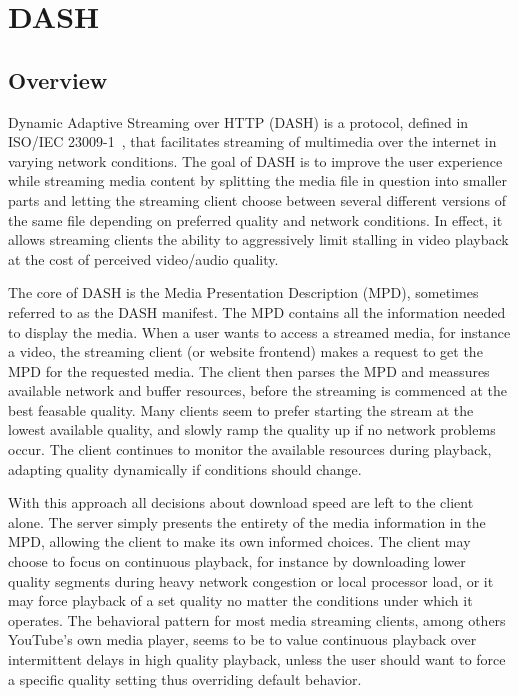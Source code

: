 \section{DASH}

\subsection{Overview}

Dynamic Adaptive Streaming over HTTP (DASH) is a protocol, defined in
ISO/IEC 23009-1~\cite{iso-dash-2014}, that facilitates 
streaming of multimedia over the internet in varying network conditions.
The goal of DASH is to improve the user
experience while streaming media content by splitting the media file in question
into smaller parts and letting the streaming client choose between several
different versions of the same file depending on preferred quality and network
conditions. In effect, it allows streaming clients the ability to aggressively
limit stalling in video playback at the cost of perceived video/audio quality.

The core of DASH is the Media Presentation Description (MPD), sometimes
referred to as the DASH manifest. The MPD contains all the information
needed to display the media. When a user wants to access a streamed
media, for instance a video, the streaming client (or website frontend)
makes a request to get the MPD for the requested media. The client then
parses the MPD and meassures available network and buffer resources,
before the streaming is commenced at the best feasable quality. Many clients %
seem to prefer starting the stream at the lowest available quality, and
slowly ramp the quality up if no network problems occur. The
client continues to monitor the available resources during playback, adapting
quality dynamically if conditions should change.

With this approach all decisions about download speed are left to the client
alone.
The server simply presents the entirety of the media information in the MPD,
allowing the client to make its own informed choices. The client may choose
to focus on continuous playback, for instance by downloading lower quality
segments during heavy network congestion or local processor load, or it may
force playback of a set quality no matter the conditions under which it
operates. The behavioral pattern for most media streaming clients, among
others YouTube's own media player, seems to be to value continuous playback
over intermittent delays in high quality playback, unless the user should want
to force a specific quality setting thus overriding default behavior.


